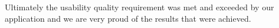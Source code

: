 \documentclass[12pt]{article}
\begin{document}
Ultimately the usability quality requirement was met and exceeded by our application and we are very proud of the results that were achieved.


\newpage

\end{document}
